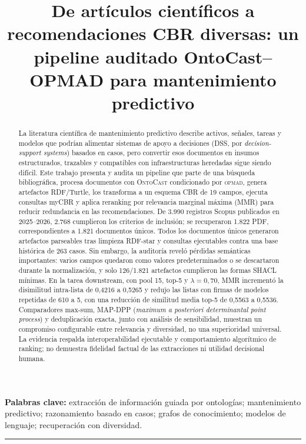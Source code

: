 \documentclass[11pt,a4paper]{article}
\title{\textbf{De artículos científicos a recomendaciones CBR diversas: un pipeline auditado OntoCast--OPMAD para mantenimiento predictivo}}
\author{}
\date{}
\newcommand{\OPMAD}{\textsc{opmad}}
\newcommand{\OntoCast}{\textsc{OntoCast}}
\newcommand{\myCBR}{myCBR}
\begin{document}
\maketitle

\begin{abstract}
La literatura científica de mantenimiento predictivo describe activos, señales, tareas y modelos que podrían alimentar sistemas de apoyo a decisiones (DSS, por \emph{decision-support systems}) basados en casos, pero convertir esos documentos en insumos estructurados, trazables y compatibles con infraestructuras heredadas sigue siendo difícil. Este trabajo presenta y audita un pipeline que parte de una búsqueda bibliográfica, procesa documentos con \OntoCast{} condicionado por \OPMAD{}, genera artefactos RDF/Turtle, los transforma a un esquema CBR de 19 campos, ejecuta consultas \myCBR{} y aplica reranking por relevancia marginal máxima (MMR) para reducir redundancia en las recomendaciones. De 3.990 registros Scopus publicados en 2025--2026, 2.768 cumplieron los criterios de inclusión; se recuperaron 1.822 PDF, correspondientes a 1.821 documentos únicos. Todos los documentos únicos generaron artefactos parseables tras limpieza RDF-star y consultas ejecutables contra una base histórica de 263 casos. Sin embargo, la auditoría reveló pérdidas semánticas importantes: varios campos quedaron como valores predeterminados o se descartaron durante la normalización, y solo 126/1.821 artefactos cumplieron las formas SHACL mínimas. En la tarea downstream, con pool 15, top-5 y $\lambda=0{,}70$, MMR incrementó la disimilitud intra-lista de 0,4216 a 0,5265 y redujo las listas con firmas de modelos repetidas de 610 a 5, con una reducción de similitud media top-5 de 0,5563 a 0,5536. Comparadores max-sum, MAP-DPP (\emph{maximum a posteriori determinantal point process}) y deduplicación exacta, junto con análisis de sensibilidad, muestran un compromiso configurable entre relevancia y diversidad, no una superioridad universal. La evidencia respalda interoperabilidad ejecutable y comportamiento algorítmico de ranking; no demuestra fidelidad factual de las extracciones ni utilidad decisional humana.
\end{abstract}

\noindent\textbf{Palabras clave:} extracción de información guiada por ontologías; mantenimiento predictivo; razonamiento basado en casos; grafos de conocimiento; modelos de lenguaje; recuperación con diversidad.

\begin{center}
\rule{0.92\linewidth}{0.4pt}
\end{center}
\end{document}

